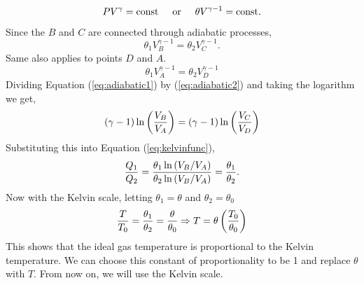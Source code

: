         \begin{equation}
            PV^\gamma = \text{const} \hspace{0.5cm} \text{or} \hspace{0.5cm} \theta V^{\gamma-1}=\text{const}.
        \end{equation}
        Since the $B$ and $C$ are connected through adiabatic processes, 
        \begin{equation}
            \theta_1V_B^{\gamma-1} = \theta_2V_C^{\gamma-1}.
            \label{eq:adiabatic1}
        \end{equation}
        Same also applies to points $D$ and $A$.
        \begin{equation}
            \theta_1V_A^{\gamma-1} = \theta_2V_D^{\gamma-1}
            \label{eq:adiabatic2}
        \end{equation}
        Dividing Equation (\ref{eq:adiabatic1}) by (\ref{eq:adiabatic2}) and taking the logarithm we get,
        \begin{equation}
            (\gamma-1)\ln\left( \frac{V_B}{V_A} \right) = (\gamma-1)\ln\left( \frac{V_C}{V_D} \right)
        \end{equation}
        Substituting this into Equation (\ref{eq:kelvinfunc}),
        \begin{equation}
            \frac{Q_1}{Q_2} = \frac{\theta_1\ln\left( V_B/V_A \right)}{\theta_2\ln\left( V_B/V_A \right)} = \frac{\theta_1}{\theta_2}.
        \end{equation}
        Now with the Kelvin scale, letting $\theta_1 = \theta$ and $\theta_2=\theta_0$
        \begin{equation}
            \frac{T}{T_0} = \frac{\theta_1}{\theta_2} = \frac{\theta}{\theta_0} \Rightarrow T = \theta\left( \frac{T_0}{\theta_0} \right)
        \end{equation}
        This shows that the ideal gas temperature is proportional to the Kelvin temperature. We can choose this constant of proportionality to be 1 and replace $\theta$ with $T$. From now on, we will use the Kelvin scale.
